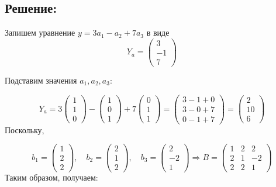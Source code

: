 \documentclass{article}
\begin{document}
        \subsection{Решение:}
        Запишем  уравнение $y = 3a_1 - a_2 + 7a_3$ в виде 
                \[
        Y_a = \left(
        \begin{array}{c}
        3 \\
        -1 \\
        7
        \end{array}
        \right)
        \]

        Подставим значения \( a_1, a_2, a_3 \):

        \[
        Y_a = 3 \begin{pmatrix} 1 \\ 1 \\ 0 \end{pmatrix} - \begin{pmatrix} 1 \\ 0 \\ 1 \end{pmatrix} + 7 \begin{pmatrix} 0 \\ 1 \\ 1 \end{pmatrix} = \begin{pmatrix} 3 - 1 + 0 \\ 3 - 0 + 7 \\ 0 - 1 + 7 \end{pmatrix} = \begin{pmatrix} 2 \\ 10 \\ 6 \end{pmatrix}
        \]
        Поскольку, 
        
        \[
        b_1 = \begin{pmatrix} 1 \\ 2 \\ 2 \end{pmatrix}, \quad b_2 = \begin{pmatrix} 2 \\ 1 \\ 2 \end{pmatrix}, \quad b_3 = \begin{pmatrix} 2 \\ -2 \\ 1 \end{pmatrix} \Longrightarrow 
        B = \begin{pmatrix}
        1 & 2 & 2 \\
        2 & 1 & -2 \\
        2 & 2 & 1
        \end{pmatrix}
        \]
        Таким образом, получаем:
        
\end{document}
